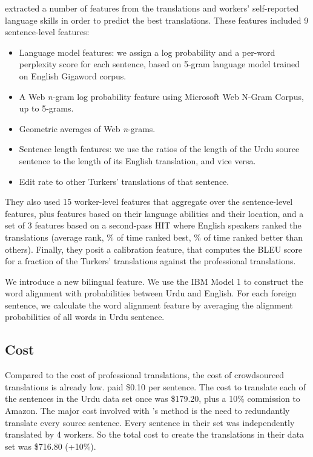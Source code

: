 \documentclass[11pt]{article}
\begin{document}
 extracted a number of features from the translations and workers' self-reported language skills in order to predict the best translations.   These features included 9 sentence-level features:
\begin{itemize}
\item Language model features:	we assign a log probability and a per-word perplexity score for each sentence, based on 5-gram language model trained on English Gigaword corpus.
\item A Web \textit{n}-gram log probability feature using Microsoft Web N-Gram Corpus, up to 5-grams.
\item Geometric averages of Web \textit{n}-grams.
\item Sentence length features:	we use the ratios of the length of the Urdu source sentence to the length of its English translation, and vice versa.
\item Edit rate to other Turkers' translations of that sentence.
\end{itemize}
They also used 15 worker-level features that aggregate over the sentence-level features, plus features based on their language abilities and their location, and a set of 3 features based on a second-pass HIT where English speakers ranked the translations (average rank, \% of time ranked best, \% of time ranked better than others).   Finally, they posit a calibration feature, that computes the BLEU score for a fraction of the Turkers' translations against the professional translations. 


We introduce a new bilingual feature. We use the IBM Model 1 to construct the word alignment with probabilities between Urdu and English. For each foreign sentence, we calculate the word alignment feature by averaging the alignment probabilities of all words in Urdu sentence. 



\subsection{Cost}

Compared to the cost of professional translations, the cost of crowdsourced translations is already low.  paid \$0.10 per sentence.  The cost to translate each of the sentences in the Urdu data set once was \$179.20, plus a 10\% commission to Amazon.  The major cost involved with   's method is the need to redundantly translate every source sentence.   Every sentence in their set was independently translated by 4 workers.  So the total cost to create the translations in their data set was \$716.80 (+10\%).
\end{document}
